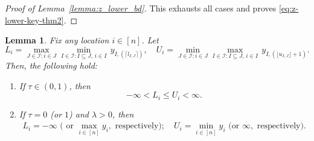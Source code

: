 \documentclass[11pt]{article}
\newcommand{\I}{\mathcal{I}}
\theoremstyle{plain}
\newtheorem{lemma}[theorem]{Lemma}
\theoremstyle{definition}
\theoremstyle{remark}
\begin{document}
\begin{appendix}
\begin{proof} [Proof of Lemma~\ref{lemma:z_lower_bd}]
This exhausts all cases and proves \eqref{eq:z-lower-key-thm2}.
\end{proof}
\begin{lemma}\label{lem:minmax_finite}
    Fix any location $i\in [n]$. Let 
    \[L_i=\max_{J\in \I: i \in J}\min_{I\in \I: I\subseteq J,\, i \in I}\, y_{I,(\lceil l_{I,J}\rceil)},\quad U_i=\min_{J\in \I: i \in J}\max_{I\in \I: I\subseteq J,\, i \in I}\, y_{I,(\lfloor u_{I,J}\rfloor+1)}.\]
    Then, the following hold:
    \begin{enumerate}
        \item If $\tau \in (0,1)$, then
        \begin{equation*}\label{eqn:minmax_finite}
-\infty<L_i\leq U_i  <\infty.
 \end{equation*}
 \item If $\tau=0$ (or $1$) and $\lambda>0$, then
  \begin{align*}\label{eqn:minmax_infinite}
 L_i=-\infty\text{ ( or }\max_{i \in [n]}y_i,\text{ respectively});\quad U_i =\min_{i \in [n]}y_i\text{ (or }\infty,\text{ respectively)}.
 \end{align*}
    \end{enumerate}
    

\end{lemma}
\end{appendix}
\end{document}

